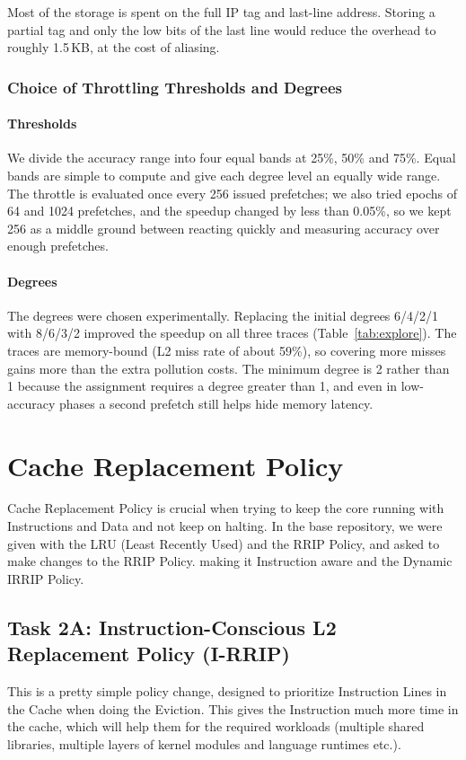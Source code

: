 \documentclass[11pt,a4paper]{article}
\begin{document}
  Most of the storage is spent on the full IP tag and last-line address.
  Storing a partial tag and only the low bits of the last line would
  reduce the overhead to roughly 1.5\,KB, at the cost of
  aliasing.

  \subsubsection{Choice of Throttling Thresholds and Degrees}

  \paragraph{Thresholds} We divide the accuracy range into four equal
  bands at 25\%, 50\% and 75\%. Equal bands are simple to compute and
  give each degree level an equally wide range. The throttle is
  evaluated once every 256 issued prefetches; we also tried epochs of 64
  and 1024 prefetches, and the speedup changed by less than 0.05\%, so we
  kept 256 as a middle ground between reacting quickly and measuring
  accuracy over enough prefetches.

  \paragraph{Degrees} The degrees were chosen experimentally. Replacing
  the initial degrees 6/4/2/1 with 8/6/3/2 improved the speedup on all
  three traces (Table~\ref{tab:explore}). The traces are memory-bound
  (L2 miss rate of about 59\%), so covering more misses gains more than
  the extra pollution costs. The minimum degree is 2 rather than 1
  because the assignment requires a degree greater than 1, and even in
  low-accuracy phases a second prefetch still helps hide memory latency.


\section{Cache Replacement Policy}
Cache Replacement Policy is crucial when trying to keep the core running with Instructions and Data and not keep on halting. In the base repository, we were given with the LRU (Least Recently Used) and the RRIP Policy, and asked to make changes to the RRIP Policy. making it Instruction aware and the Dynamic IRRIP Policy.

\subsection{Task 2A: Instruction-Conscious L2 Replacement Policy (I-RRIP)}
This is a pretty simple policy change, designed to prioritize Instruction Lines in the Cache when doing the Eviction. This gives the Instruction much more time in the cache, which will help them for the required workloads (multiple shared libraries, multiple layers of kernel modules and language runtimes etc.). 
\end{document}
